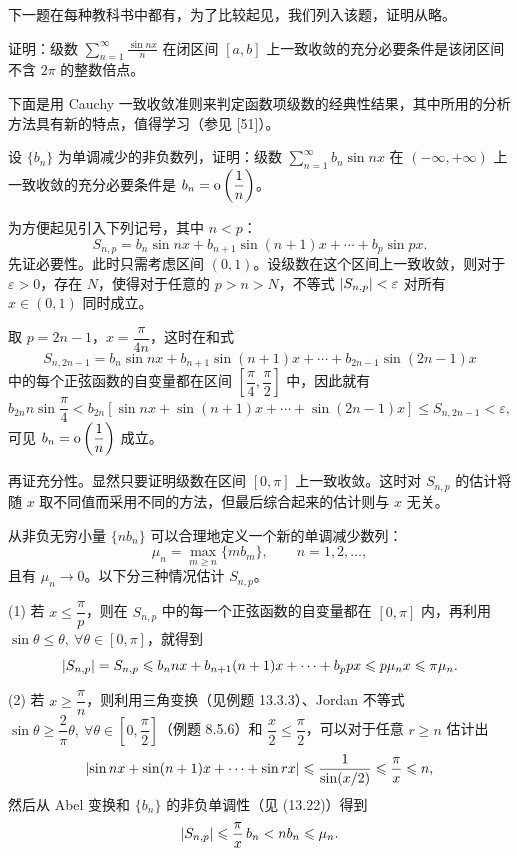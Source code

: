 下一题在每种教科书中都有，为了比较起见，我们列入该题，证明从略。

\begin{xexample}[14.1.7]
证明：级数 $\displaystyle\sum_{n=1}^{\infty}\frac{\sin nx}{n}$ 在闭区间 $[a,b]$ 上一致收敛的充分必要条件是该闭区间不含 $2\pi$ 的整数倍点。
\end{xexample}

下面是用 Cauchy 一致收敛准则来判定函数项级数的经典性结果，其中所用的分析方法具有新的特点，值得学习（参见 [51]）。

\begin{xexample}[14.1.8]
设 $\{b_n\}$ 为单调减少的非负数列，证明：级数 $\displaystyle\sum_{n=1}^{\infty}b_n\sin nx$ 在 $(-\infty,+\infty)$ 上一致收敛的充分必要条件是 $b_n=\mathrm{o}\left(\dfrac1n\right)$。
\end{xexample}
\begin{xproof}
为方便起见引入下列记号，其中 $n<p$：
\[
  S_{n,p}=b_n\sin nx+b_{n+1}\sin(n+1)x+\cdots+b_p\sin px.
\]
先证必要性。此时只需考虑区间 $(0,1)$。设级数在这个区间上一致收敛，则对于 $\varepsilon>0$，存在 $N$，使得对于任意的 $p>n>N$，不等式 $\lvert S_{n,p}\rvert<\varepsilon$ 对所有 $x\in(0,1)$ 同时成立。

取 $p=2n-1$，$x=\dfrac{\pi}{4n}$，这时在和式
\[
  S_{n,2n-1}=b_n\sin nx+b_{n+1}\sin(n+1)x+\cdots+b_{2n-1}\sin(2n-1)x
\]
中的每个正弦函数的自变量都在区间 $\left[\dfrac\pi4,\dfrac\pi2\right]$ 中，因此就有
\[
  b_{2n}n\sin\frac\pi4<b_{2n}[\sin nx+\sin(n+1)x+\cdots+\sin(2n-1)x]\leqslant S_{n,2n-1}<\varepsilon,
\]
可见 $b_n=\mathrm{o}\left(\dfrac1n\right)$ 成立。

再证充分性。显然只要证明级数在区间 $[0,\pi]$ 上一致收敛。这时对 $S_{n,p}$ 的估计将随 $x$ 取不同值而采用不同的方法，但最后综合起来的估计则与 $x$ 无关。

从非负无穷小量 $\{nb_n\}$ 可以合理地定义一个新的单调减少数列：
\[
  \mu_n=\max_{m\geqslant n}\{mb_m\},\qquad n=1,2,\ldots,
\]
且有 $\mu_n\to0$。以下分三种情况估计 $S_{n,p}$。

(1) 若 $x\leqslant\dfrac\pi p$，则在 $S_{n,p}$ 中的每一个正弦函数的自变量都在 $[0,\pi]$ 内，再利用 $\sin\theta\leqslant\theta,\ \forall\theta\in[0,\pi]$，就得到
\[
  \lvert S_{n,p}\rvert=S_{n,p}\leqslant b_nnx+b_{n+1}(n+1)x+\cdots+b_ppx\leqslant p\mu_nx\leqslant\pi\mu_n.
\]

(2) 若 $x\geqslant\dfrac\pi n$，则利用三角变换（见例题 13.3.3）、Jordan 不等式 $\sin\theta\geqslant\dfrac2\pi\theta,\ \forall\theta\in[0,\dfrac\pi2]$（例题 8.5.6）和 $\dfrac x2\leqslant\dfrac\pi2$，可以对于任意 $r\geqslant n$ 估计出
\[
  \lvert\sin nx+\sin(n+1)x+\cdots+\sin rx\rvert\leqslant\frac1{\sin(x/2)}\leqslant\frac\pi x\leqslant n,
\]
然后从 Abel 变换和 $\{b_n\}$ 的非负单调性（见 (13.22)）得到
\[
  \lvert S_{n,p}\rvert\leqslant\frac\pi x\,b_n<nb_n\leqslant\mu_n.
\]


\end{xproof}
